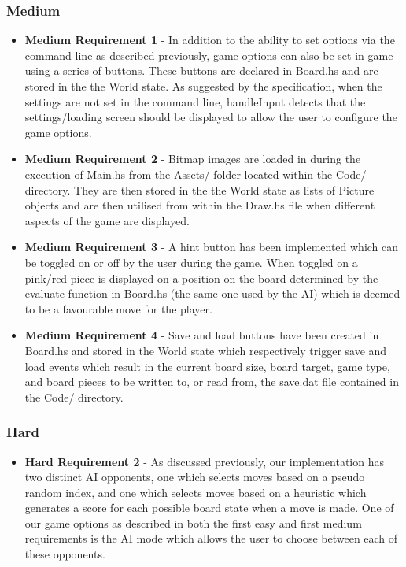 \documentclass[11]{article}
\begin{document}
		\subsubsection{Medium}
			\begin{itemize}
				\item \textbf{Medium Requirement 1} - In addition to the ability to set options via the command line as described previously, game options can also be set in-game using a series of buttons. These buttons are declared in Board.hs and are stored in the the World state. As suggested by the specification, when the settings are not set in the command line, handleInput detects that the settings/loading screen should be displayed to allow the user to configure the game options. 
				\item \textbf{Medium Requirement 2} - Bitmap images are loaded in during the execution of Main.hs from the Assets/ folder located within the Code/ directory. They are then stored in the the World state as lists of Picture objects and are then utilised from within the Draw.hs file when different aspects of the game are displayed.
				\item \textbf{Medium Requirement 3} - A hint button has been implemented which can be toggled on or off by the user during the game. When toggled on a pink/red piece is displayed on a position on the board determined by the evaluate function in Board.hs (the same one used by the AI) which is deemed to be a favourable move for the player.
				\item \textbf{Medium Requirement 4} - Save and load buttons have been created in Board.hs and stored in the World state which respectively trigger save and load events which result in the current board size, board target, game type, and board pieces to be written to, or read from, the save.dat file contained in the Code/ directory.
			\end{itemize}
		\subsubsection{Hard}
				\begin{itemize}
					\item \textbf{Hard Requirement 2} - As discussed previously, our implementation has two distinct AI opponents, one which selects moves based on a pseudo random index, and one which selects moves based on a heuristic which generates a score for each possible board state when a move is made. One of our game options as described in both the first easy and first medium requirements is the AI mode which allows the user to choose between each of these opponents.
				\end{itemize}
\end{document}
